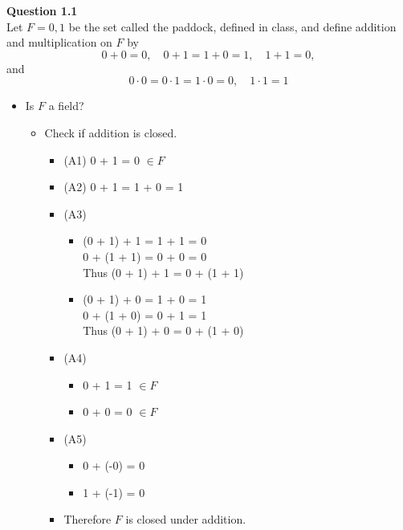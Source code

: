 \documentclass[12pt]{article}
\begin{document}
 


\noindent \textbf{Question 1.1}\\
Let $F = {0,1}$ be the set called the paddock, defined in class, and define addition and multiplication on $F$ by 
$$0 + 0 = 0,\quad 0 + 1 = 1 + 0 = 1,\quad 1 + 1 = 0,$$
and
$$ 0 \cdot 0 = 0\cdot1 = 1\cdot0 = 0, \quad 1\cdot1 = 1$$
\begin{itemize}
    \item Is $F$ a field? 
        \begin{itemize}
            \item Check if addition is closed.
                \begin{itemize}
                    \item (A1) 0 + 1 = 0 $\in F$
                    \item (A2) 0 + 1 = 1 + 0 = 1
                    \item (A3)
                        \begin{itemize}
                            \item (0 + 1) + 1 = 1 + 1 = 0\\
                                  0 + (1 + 1) = 0 + 0 = 0\\
                                  Thus (0 + 1) + 1 = 0 + (1 + 1) \\
                            \item (0 + 1) + 0 = 1 + 0 = 1\\
                                  0 + (1 + 0) = 0 + 1 = 1\\
                                  Thus (0 + 1) + 0 = 0 + (1 + 0) 
                        \end{itemize}
                        
                    \item (A4)
                        \begin{itemize}
                            \item 0 + 1 = 1 $\in F$
                            \item 0 + 0 = 0 $\in F$
                        \end{itemize}
                    \item (A5) 
                        \begin{itemize}
                            \item 0 + (-0) = 0
                            \item 1 + (-1) = 0
                        \end{itemize}
                    \item Therefore $F$ is closed under addition.
                \end{itemize}
                

\end{itemize}
\end{itemize}
\end{document}
